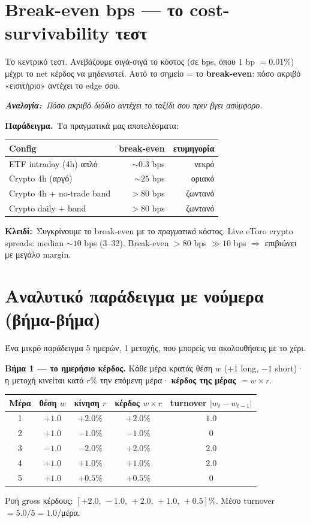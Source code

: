 \documentclass[11pt]{article}
\newcommand{\key}[1]{\par\medskip\noindent\colorbox{soft}{\parbox{\dimexpr\linewidth-2\fboxsep}{\textcolor{accent}{\textbf{Κλειδί:}}\ #1}}\par\medskip}
\newcommand{\ex}[1]{\par\smallskip\noindent\textbf{\textcolor{accent}{Παράδειγμα.}}\ #1\par\smallskip}
\newcommand{\analogy}[1]{\par\smallskip\noindent\textit{\textbf{Αναλογία:}\ #1}\par\smallskip}
\begin{document}
\section{Break-even bps — το cost-survivability τεστ}
Το κεντρικό τεστ. Ανεβάζουμε σιγά-σιγά το κόστος (σε bps, όπου $1$ bp $=0.01\%$) μέχρι το net κέρδος
να μηδενιστεί. Αυτό το σημείο = το \textbf{break-even}: πόσο ακριβό «εισιτήριο» αντέχει το edge σου.
\analogy{Πόσο ακριβό διόδιο αντέχει το ταξίδι σου πριν βγει ασύμφορο.}
\ex{Τα πραγματικά μας αποτελέσματα:}
\begin{center}\small
\begin{tabular}{lrr}
\toprule
Config & break-even & ετυμηγορία \\
\midrule
ETF intraday (4h) απλό & $\sim 0.3$ bps & \textcolor{warn}{νεκρό} \\
Crypto 4h (αργό) & $\sim 25$ bps & οριακό \\
Crypto 4h + no-trade band & $>80$ bps & \textcolor{good}{ζωντανό} \\
Crypto daily + band & $>80$ bps & \textcolor{good}{ζωντανό} \\
\bottomrule
\end{tabular}
\end{center}
\key{Συγκρίνουμε το break-even με το \emph{πραγματικό} κόστος. Live eToro crypto spreads: median
$\sim 10$ bps (3--32). Break-even $>80$ bps $\gg 10$ bps $\Rightarrow$ \textcolor{good}{επιβιώνει με μεγάλο margin}.}

\section{Αναλυτικό παράδειγμα με νούμερα (βήμα-βήμα)}
Ένα μικρό παράδειγμα 5 ημερών, 1 μετοχής, που μπορείς να ακολουθήσεις με το χέρι.

\textbf{Βήμα 1 --- το ημερήσιο κέρδος.} Κάθε μέρα κρατάς θέση $w$ ($+1$ long, $-1$ short)· η μετοχή
κινείται κατά $r\%$ την επόμενη μέρα· \textbf{κέρδος της μέρας $= w\times r$}.
\begin{center}\small
\begin{tabular}{ccccc}
\toprule
Μέρα & θέση $w$ & κίνηση $r$ & κέρδος $w\times r$ & turnover $|w_t-w_{t-1}|$ \\
\midrule
1 & $+1.0$ & $+2.0\%$ & $+2.0\%$ & $1.0$ \\
2 & $+1.0$ & $-1.0\%$ & $-1.0\%$ & $0$ \\
3 & $-1.0$ & $-2.0\%$ & $+2.0\%$ & $2.0$ \\
4 & $+1.0$ & $+1.0\%$ & $+1.0\%$ & $2.0$ \\
5 & $+1.0$ & $+0.5\%$ & $+0.5\%$ & $0$ \\
\bottomrule
\end{tabular}
\end{center}
Ροή gross κέρδους: $[+2.0,\,-1.0,\,+2.0,\,+1.0,\,+0.5]\%$. Μέσο turnover $=5.0/5=1.0$/μέρα.
\end{document}
